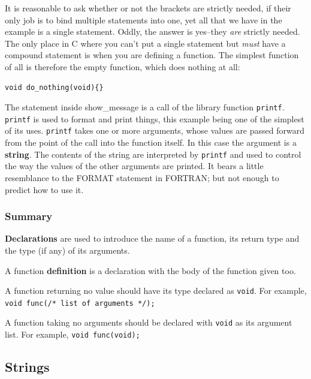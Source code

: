     It is reasonable to ask whether or not the brackets are strictly needed,
     if their only job is to bind multiple statements into one, yet all that we
     have in the example is a single statement. Oddly, the answer is
     yes--they \textit{are} strictly needed. The only place in C where you
     can't put a single statement but \textit{must} have a compound statement
     is when you are defining a function. The simplest function of all is
     therefore the empty function, which does nothing at all:


    \begin{Verbatim}
void do_nothing(void){}
\end{Verbatim}

    The statement inside show\_message is a call of the library function
     \texttt{printf}. \texttt{printf} is used to format and print
     things, this example being one of the simplest of its
     uses. \texttt{printf} takes one or more arguments, whose values are
     passed forward from the point of the call into the function itself. In
     this case the argument is a \textbf{string}. The contents of the string
     are interpreted by \texttt{printf} and used to control the way the
     values of the other arguments are printed. It bears a little resemblance
     to the FORMAT statement in FORTRAN; but not enough to predict how to use
     it.


   

   \subsubsection{Summary}
    \textbf{Declarations} are used to introduce the name of a function,
     its return type and the type (if any) of its arguments.

    A function \textbf{definition} is a declaration with the body of the
     function given too.

    A function returning no value should have its type declared as
     \texttt{void}. For example,
     \texttt{void func(/* list of arguments */);}
    

    A function taking no arguments should be declared with \texttt{void}
     as its argument list. For example, \texttt{void func(void);}

   

  

  \subsection{Strings}
   

